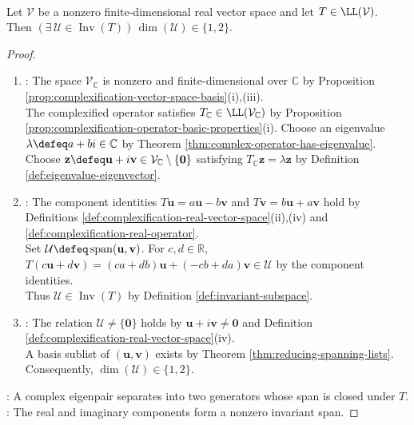 \begin{theorem} \label{thm:real-operator-invariant-line-or-plane} \\
Let $\mathcal{V}$ be a nonzero finite-dimensional real vector space and let $T\in\LL(\mathcal{V})$.\\
Then $(\exists\,\mathcal{U}\in\operatorname{Inv}(T))\,\dim(\mathcal{U})\in\{1,2\}$.
\begin{proof}
\begin{enumerate}[label=(\roman*)]
\setlength{\itemsep}{0pt}
\item {}: The space $\mathcal{V}_{\mathbb{C}}$ is nonzero and finite-dimensional over $\mathbb{C}$ by Proposition \ref{prop:complexification-vector-space-basis}(i),(iii).\\
The complexified operator satisfies $T_{\mathbb{C}}\in\LL(\mathcal{V}_{\mathbb{C}})$ by Proposition \ref{prop:complexification-operator-basic-properties}(i). Choose an eigenvalue $\lambda\defeq a+bi\in\mathbb{C}$ by Theorem \ref{thm:complex-operator-has-eigenvalue}.\\
Choose $\mathbf{z}\defeq\mathbf{u}+i\mathbf{v}\in\mathcal{V}_{\mathbb{C}}\setminus\{\mathbf{0}\}$ satisfying $T_{\mathbb{C}}\mathbf{z}=\lambda\mathbf{z}$ by Definition \ref{def:eigenvalue-eigenvector}.
\item {}: The component identities $T\mathbf{u}=a\mathbf{u}-b\mathbf{v}$ and $T\mathbf{v}=b\mathbf{u}+a\mathbf{v}$ hold by Definitions \ref{def:complexification-real-vector-space}(ii),(iv) and \ref{def:complexification-real-operator}.\\
Set $\mathcal{U}\defeq\operatorname{span}(\mathbf{u},\mathbf{v})$. For $c,d\in\mathbb{R}$, $T(c\mathbf{u}+d\mathbf{v})=(ca+db)\mathbf{u}+(-cb+da)\mathbf{v}\in\mathcal{U}$ by the component identities.\\
Thus $\mathcal{U}\in\operatorname{Inv}(T)$ by Definition \ref{def:invariant-subspace}.
\item {}: The relation $\mathcal{U}\neq\{\mathbf{0}\}$ holds by $\mathbf{u}+i\mathbf{v}\neq\mathbf{0}$ and Definition \ref{def:complexification-real-vector-space}(iv).\\
A basis sublist of $(\mathbf{u},\mathbf{v})$ exists by Theorem \ref{thm:reducing-spanning-lists}. Consequently, $\dim(\mathcal{U})\in\{1,2\}$.
\end{enumerate}
: A complex eigenpair separates into two generators whose span is closed under $T$.\\
: The real and imaginary components form a nonzero invariant span.
\end{proof}
\end{theorem}

